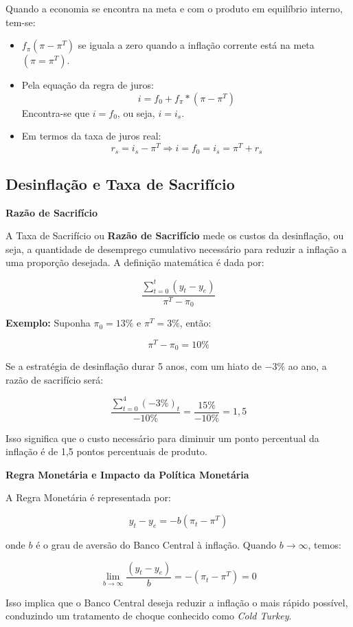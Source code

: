 \documentclass[a4paper,12pt]{article}[abntex2]
\begin{document}
Quando a economia se encontra na meta e com o produto em equilíbrio interno, tem-se: \begin{itemize}
    \item \( f_\pi (\pi - \pi^T) \) se iguala a zero quando a inflação corrente está na meta \( (\pi = \pi^T) \).
    \item Pela equação da regra de juros:
    \[
    i = f_0 + f_\pi * (\pi - \pi^T)
    \]
    Encontra-se que \( i = f_0 \), ou seja, \( i = i_s \).
    \item Em termos da taxa de juros real:
    \[
    r_s = i_s - \pi^T \Rightarrow i = f_0 = i_s = \pi^T + r_s
    \]
\end{itemize}

\subsection{\textbf{Desinflação e Taxa de Sacrifício}}

\textbf{Razão de Sacrifício}

A Taxa de Sacrifício ou \textbf{Razão de Sacrifício} mede os custos da desinflação, ou seja, a quantidade de desemprego cumulativo necessário para reduzir a inflação a uma proporção desejada. A definição matemática é dada por:

\[
\frac{\sum_{t=0}^{t} (y_t - y_e)}{\pi^T - \pi_0}
\]

\textbf{Exemplo:}  
Suponha \( \pi_0 = 13\% \) e \( \pi^T = 3\% \), então:

\[
\pi^T - \pi_0 = 10\%
\]

Se a estratégia de desinflação durar 5 anos, com um hiato de \( -3\% \) ao ano, a razão de sacrifício será:

\[
\frac{\sum_{t=0}^{4} (-3\%)_t}{-10\%} = \frac{15\%}{-10\%} = 1,5
\]

Isso significa que o custo necessário para diminuir um ponto percentual da inflação é de 1,5 pontos percentuais de produto.

\textbf{Regra Monetária e Impacto da Política Monetária}

A Regra Monetária é representada por:

\[
y_t - y_e = - b (\pi_t - \pi^T)
\]

onde \( b \) é o grau de aversão do Banco Central à inflação. Quando \( b \to \infty \), temos:

\[
\lim_{b \to \infty} \frac{(y_t - y_e)}{b} = -(\pi_t - \pi^T) = 0
\]

Isso implica que o Banco Central deseja reduzir a inflação o mais rápido possível, conduzindo um tratamento de choque conhecido como \textit{Cold Turkey}.
\end{document}

